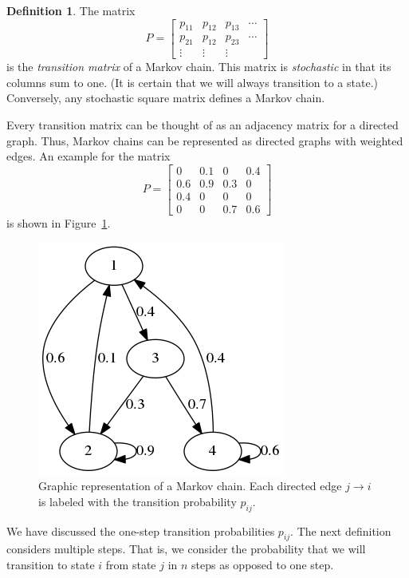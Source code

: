 \documentclass[12pt]{article}
\theoremstyle{definition}
\newtheorem{defn}{Definition}
\begin{document}
\begin{defn}
    \label{defn:trans-matrix}
    The matrix
    $$P =
    \begin{bmatrix}
        p_{11} & p_{12} & p_{13} & \cdots \\
        p_{21} & p_{12} & p_{23} & \cdots \\
        \vdots & \vdots & \vdots
    \end{bmatrix}$$
    is the \emph{transition matrix} of a Markov chain. This matrix is
    \emph{stochastic} in that its columns sum to one. (It is certain that we
    will always transition to a state.) Conversely, any stochastic square
    matrix defines a Markov chain.
\end{defn}

Every transition matrix can be thought of as an adjacency matrix for a directed
graph. Thus, Markov chains can be represented as directed graphs with weighted
edges. An example for the matrix $$P =
\begin{bmatrix}
    0   & 0.1 & 0 & 0.4 \\
    0.6 & 0.9 & 0.3 & 0 \\
    0.4 & 0   & 0 & 0 \\
    0   & 0   & 0.7 & 0.6
\end{bmatrix}
$$
is shown in Figure~\ref{fig:graph}.

\begin{figure}[]
    \centering
    \includegraphics[width=.5\textwidth, keepaspectratio]{markov.png}
    \caption{Graphic representation of a Markov chain. Each directed edge $j
    \to i$ is labeled with the transition probability $p_{ij}$.}
    \label{fig:graph}
\end{figure}

We have discussed the one-step transition probabilities $p_{ij}$. The next
definition considers multiple steps. That is, we consider the probability that
we will transition to state $i$ from state $j$ in $n$ steps as opposed to one
step.
\end{document}
